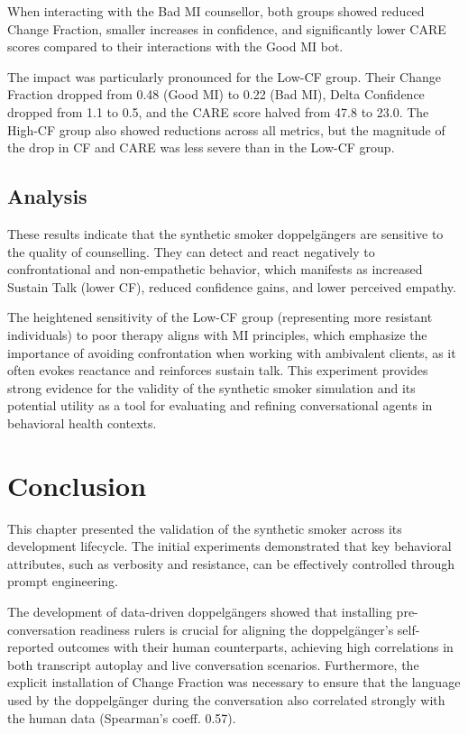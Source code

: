 When interacting with the Bad MI counsellor, both groups showed reduced Change Fraction, smaller increases in confidence, and significantly lower CARE scores compared to their interactions with the Good MI bot.

The impact was particularly pronounced for the Low-CF group. Their Change Fraction dropped from 0.48 (Good MI) to 0.22 (Bad MI), Delta Confidence dropped from 1.1 to 0.5, and the CARE score halved from 47.8 to 23.0. The High-CF group also showed reductions across all metrics, but the magnitude of the drop in CF and CARE was less severe than in the Low-CF group.

\subsection{Analysis}

These results indicate that the synthetic smoker doppelgängers are sensitive to the quality of counselling. They can detect and react negatively to confrontational and non-empathetic behavior, which manifests as increased Sustain Talk (lower CF), reduced confidence gains, and lower perceived empathy.

The heightened sensitivity of the Low-CF group (representing more resistant individuals) to poor therapy aligns with MI principles, which emphasize the importance of avoiding confrontation when working with ambivalent clients, as it often evokes reactance and reinforces sustain talk. This experiment provides strong evidence for the validity of the synthetic smoker simulation and its potential utility as a tool for evaluating and refining conversational agents in behavioral health contexts.

\section{Conclusion}

This chapter presented the validation of the synthetic smoker across its development lifecycle. The initial experiments demonstrated that key behavioral attributes, such as verbosity and resistance, can be effectively controlled through prompt engineering.

The development of data-driven doppelgängers showed that installing pre-conversation readiness rulers is crucial for aligning the doppelgänger's self-reported outcomes with their human counterparts, achieving high correlations in both transcript autoplay and live conversation scenarios. Furthermore, the explicit installation of Change Fraction was necessary to ensure that the language used by the doppelgänger during the conversation also correlated strongly with the human data (Spearman's coeff. 0.57).

